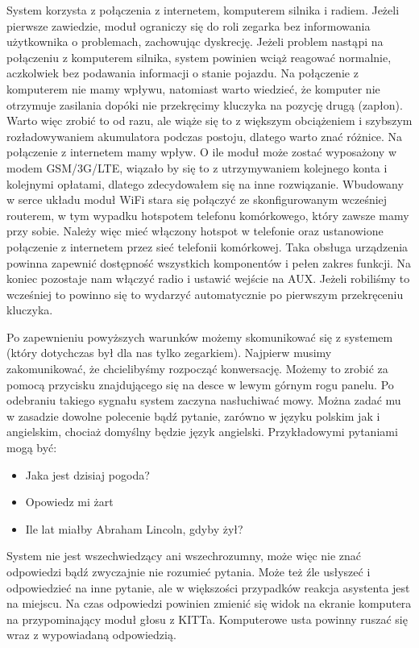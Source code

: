 \documentclass[declaration,shortabstract, inz]{iithesis}
\begin{document}
System korzysta z połączenia z internetem, komputerem silnika i radiem. Jeżeli pierwsze zawiedzie, moduł ograniczy się do roli zegarka bez informowania użytkownika o problemach, zachowując dyskrecję. Jeżeli problem nastąpi na połączeniu z komputerem silnika, system powinien wciąż reagować normalnie, aczkolwiek bez podawania informacji o stanie pojazdu. Na połączenie z komputerem nie mamy wpływu, natomiast warto wiedzieć, że komputer nie otrzymuje zasilania dopóki nie przekręcimy kluczyka na pozycję drugą (zapłon). Warto więc zrobić to od razu, ale wiąże się to z większym obciążeniem i szybszym rozładowywaniem akumulatora podczas postoju, dlatego warto znać różnice. Na połączenie z internetem mamy wpływ. O ile moduł może zostać wyposażony w modem GSM/3G/LTE, wiązało by się to z utrzymywaniem kolejnego konta i kolejnymi opłatami, dlatego zdecydowałem się na inne rozwiązanie. Wbudowany w serce układu moduł WiFi stara się połączyć ze skonfigurowanym wcześniej routerem, w tym wypadku hotspotem telefonu komórkowego, który zawsze mamy przy sobie. Należy więc mieć włączony hotspot w telefonie oraz ustanowione połączenie z internetem przez sieć telefonii komórkowej. Taka obsługa urządzenia powinna zapewnić dostępność wszystkich komponentów i pełen zakres funkcji. Na koniec pozostaje nam włączyć radio i ustawić wejście na AUX. Jeżeli robiliśmy to wcześniej to powinno się to wydarzyć automatycznie po pierwszym przekręceniu kluczyka.

Po zapewnieniu powyższych warunków możemy skomunikować się z systemem (który dotychczas był dla nas tylko zegarkiem). Najpierw musimy zakomunikować, że chcielibyśmy rozpocząć konwersację. Możemy to zrobić za pomocą przycisku znajdującego się na desce w lewym górnym rogu panelu. Po odebraniu takiego sygnału system zaczyna nasłuchiwać mowy. Można zadać mu w zasadzie dowolne polecenie bądź pytanie, zarówno w języku polskim jak i angielskim, chociaż domyślny będzie język angielski. Przykładowymi pytaniami mogą być:
\begin{itemize}
  \item Jaka jest dzisiaj pogoda?
  \item Opowiedz mi żart
  \item Ile lat miałby Abraham Lincoln, gdyby żył?
\end{itemize}
System nie jest wszechwiedzący ani wszechrozumny, może więc nie znać odpowiedzi bądź zwyczajnie nie rozumieć pytania. Może też źle usłyszeć i odpowiedzieć na inne pytanie, ale w większości przypadków reakcja asystenta jest na miejscu. Na czas odpowiedzi powinien zmienić się widok na ekranie komputera na przypominający moduł głosu z KITTa. Komputerowe usta powinny ruszać się wraz z wypowiadaną odpowiedzią.
\end{document}
